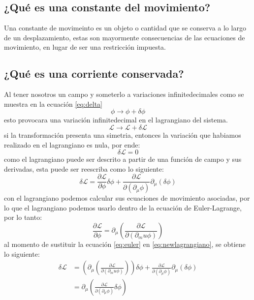 \documentclass[12pt,letterpaper]{report}
\begin{document}
\subsection*{¿Qué es una constante del movimiento?}
Una constante de movimeinto es un objeto o cantidad que se conserva a lo largo de un desplazamiento, estas son mayormente consecuencias de las ecuaciones de movimiento, en lugar de ser una restricción impuesta.
\subsection*{¿Qué es una corriente conservada?}
Al tener nosotros un campo y someterlo a variaciones infinitedecimales como se muestra en la ecuación \ref{eq:delta}
\begin{equation}
    \label{eq:delta}
    \phi \rightarrow \phi+ \delta \phi
\end{equation}
esto provocara una variación infinitedecimal en el lagrangiano del sistema.
\begin{equation*}
    \mathcal{L} \rightarrow \mathcal{L} + \delta \mathcal{L}
\end{equation*}
si la transformación presenta una simetria, entonces la variación que habiamos realizado en el lagrangiano es nula, por ende:
\begin{equation}
    \label{eq:0}
    \delta \mathcal{L} =0
\end{equation}
como el lagrangiano puede ser descrito a partir de una función de campo y sus derivadas, esta puede ser reescriba como lo siguiente:
\begin{equation}
    \label{eq:newlagrangiano}
    \delta \mathcal{L} = \frac{\partial \mathcal{L}}{\partial \phi} \delta \phi + \frac{\partial \mathcal{L}}{\partial(\partial_\mu \phi)} \partial_\mu (\delta \phi )
\end{equation}
con el lagrangiano podemos calcular sus ecuaciones de movimiento asociadas, por lo que el lagrangiano podemos usarlo dentro de la ecuación de Euler-Lagrange, por lo tanto:
\begin{equation}
    \label{eq:euler}
    \frac{\partial \mathcal{L}}{\partial \phi} = \partial_\mu \left(\frac{\partial \mathcal{L}}{\partial(\partial_mu \phi)}\right)
\end{equation}
al momento de sustituir la ecuación \ref{eq:euler} en \ref{eq:newlagrangiano}, se obtiene lo siguiente:
\begin{align*}
    \delta \mathcal{L}  &= \left(\partial_\mu \left(\frac{\partial \mathcal{L}}{\partial(\partial_mu \phi)}\right)\right) \delta \phi + \frac{\partial \mathcal{L}}{\partial(\partial_\mu \phi)} \partial_\mu (\delta \phi )\\
                        &= \partial_\mu \left(\frac{\partial \mathcal{L}}{\partial(\partial_\mu \phi)} \delta \phi \right)
\end{align*}
\end{document}
